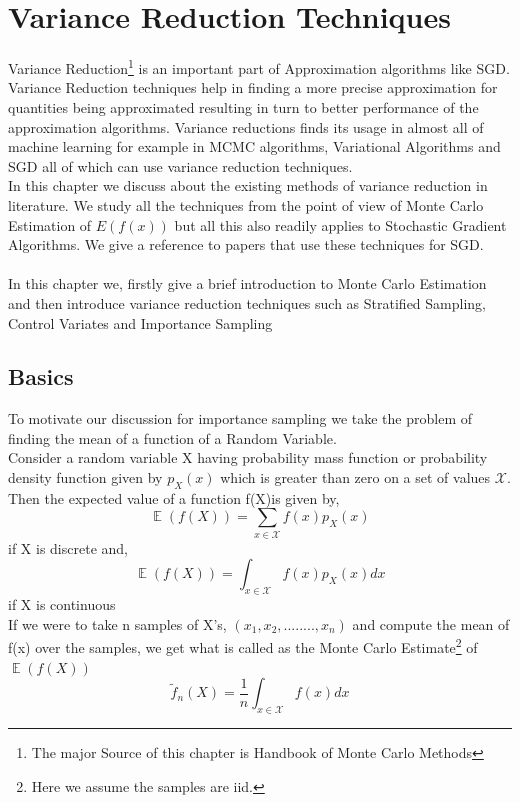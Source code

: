 \documentclass[a4paper,twoside]{iiththesis}
\theoremstyle{definition}
\theoremstyle{definition}
\theoremstyle{remark}
\DeclareMathOperator*{\E}{\mathop{\mathbb{E}}}
\begin{document}
\chapter{Variance Reduction Techniques}

Variance Reduction\footnote{ The major Source of this chapter is Handbook of Monte Carlo Methods} is an important part of Approximation algorithms like SGD. Variance Reduction techniques help in finding a more precise approximation for quantities  being approximated resulting in turn to better performance of the approximation algorithms. Variance reductions finds its usage in almost all of machine learning for example in MCMC algorithms, Variational Algorithms and SGD all of which can use variance reduction techniques. \\

In this chapter we discuss about the existing methods of variance reduction in literature. We study all the techniques from the point of view of Monte Carlo Estimation of $E(f(x))$ but all this also readily applies to Stochastic Gradient Algorithms. We give a reference to papers that use these techniques for SGD. \\ \\
In this chapter we, firstly give a brief introduction to Monte Carlo Estimation and then introduce variance reduction techniques such as Stratified Sampling, Control Variates and Importance Sampling


\section{Basics}
To motivate our discussion for importance sampling we take the problem of finding the mean of a function of a Random Variable. \\
Consider a random variable X having probability mass function or probability density function given by $p_X(x)$ which is greater than zero on a set of values $\mathcal{X}$. Then the expected value of a function f(X)is given by, 
\begin{equation}
\E (f(X)) = \sum_{x\in\mathcal{X}} f(x) p_{X}(x)
\end{equation}
if X is discrete and, 
\begin{equation}
\E (f(X)) = \int_{x\in\mathcal{X}} f(x) p_{X}(x) dx
\end{equation}
if X is continuous \\
If we were to take n samples of X's, $(x_1, x_2, ........, x_n)$ and compute the mean of f(x) over the samples, we get what is called as the Monte Carlo Estimate\footnote{\label{Basics} Here we assume the samples are iid.} of $\E (f(X))$\begin{equation}
	\widetilde{f}_{n} (X) = \frac{1}{n} \int_{x\in\mathcal{X}} f(x)dx
 \end{equation}
 
\end{document}
